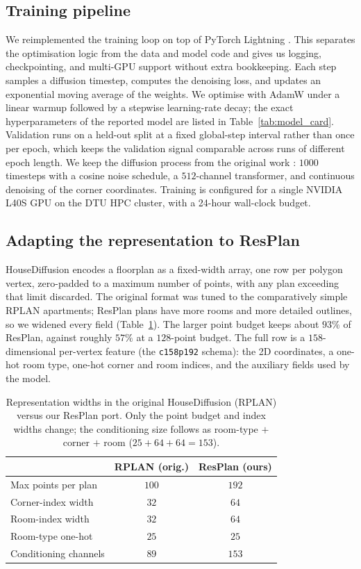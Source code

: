 \subsection{Training pipeline}
We reimplemented the training loop on top of PyTorch Lightning \cite{lightning}. This separates
the optimisation logic from the data and model code and gives us logging,
checkpointing, and multi-GPU support without extra bookkeeping. Each step samples
a diffusion timestep, computes the denoising loss, and updates an exponential
moving average of the weights. We optimise with AdamW under a linear warmup
followed by a stepwise learning-rate decay; the exact hyperparameters of the
reported model are listed in Table~\ref{tab:model_card}. Validation runs on a
held-out split at a fixed global-step
interval rather than once per epoch, which keeps the validation signal comparable
across runs of different epoch length. We keep the diffusion process from the
original work \cite{HouseDiffusion, DDPM}: $1000$ timesteps with a cosine noise
schedule, a $512$-channel transformer, and continuous denoising of the corner
coordinates. Training is configured for a single NVIDIA L40S GPU on the DTU HPC
cluster, with a 24-hour wall-clock budget.

\subsection{Adapting the representation to ResPlan}
HouseDiffusion encodes a floorplan as a fixed-width array, one row per polygon
vertex, zero-padded to a maximum number of points, with any plan exceeding that
limit discarded. The original format was tuned to the comparatively simple RPLAN
apartments; ResPlan plans have more rooms and more detailed outlines, so we
widened every field (Table~\ref{tab:repr}). The larger point budget keeps about
$93\%$ of ResPlan, against roughly $57\%$ at a $128$-point budget. The full row is
a $158$-dimensional per-vertex feature (the \texttt{c158p192} schema): the 2D
coordinates, a one-hot room type, one-hot corner and room indices, and the
auxiliary fields used by the model.

\begin{table}[t]
  \centering
  \small
  \setlength{\tabcolsep}{6pt}
  \renewcommand{\arraystretch}{1.15}
  \begin{tabular}{@{}l c c@{}}
    \toprule
    & RPLAN (orig.) & ResPlan (ours) \\
    \midrule
    Max points per plan   & $100$ & $192$ \\
    Corner-index width    & $32$  & $64$  \\
    Room-index width      & $32$  & $64$  \\
    Room-type one-hot     & $25$  & $25$  \\
    Conditioning channels & $89$  & $153$ \\
    \bottomrule
  \end{tabular}
  \caption{Representation widths in the original HouseDiffusion (RPLAN) versus our
  ResPlan port. Only the point budget and index widths change; the conditioning
  size follows as room-type $+$ corner $+$ room ($25+64+64=153$).}
  \label{tab:repr}
\end{table}

